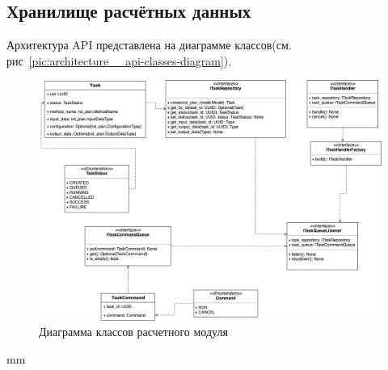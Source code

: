 \subsection{\large{Хранилище расчётных данных}}

Архитектура API представлена на диаграмме классов(см. рис\ \ref{pic:architecture__api-classes-diagram}).

\begin{figure}[H]
	\hspace*{-2.5 cm}\includegraphics[width=1.2\textwidth]{architecture/pictures/executor/execution_classes_diagram}
	\caption{Диаграмма классов расчетного модуля}
	\label{pic:architecture__execution-classes-diagram}
\end{figure}
 mm
